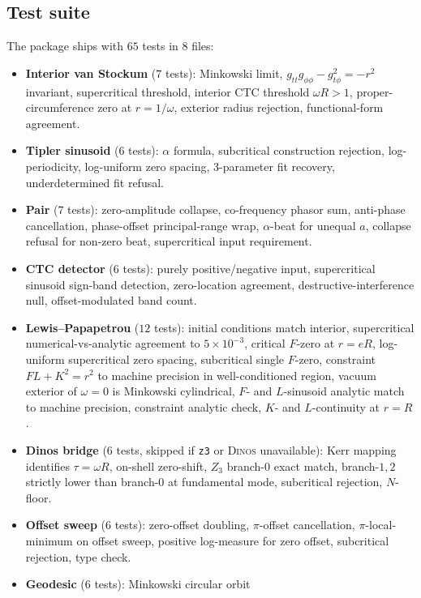\documentclass[11pt,a4paper]{article}
\begin{document}
\subsection{Test suite}

The package ships with $65$ tests in $8$ files:
\begin{itemize}[leftmargin=*]
\item \textbf{Interior van Stockum} ($7$ tests): Minkowski limit,
$g_{tt} g_{\phi\phi} - g_{t\phi}^2 = -r^2$ invariant, supercritical
threshold, interior CTC threshold $\omega R > 1$, proper-circumference
zero at $r = 1/\omega$, exterior radius rejection, functional-form
agreement.
\item \textbf{Tipler sinusoid} ($6$ tests): $\alpha$ formula, subcritical
construction rejection, log-periodicity, log-uniform zero spacing,
$3$-parameter fit recovery, underdetermined fit refusal.
\item \textbf{Pair} ($7$ tests): zero-amplitude collapse, co-frequency
phasor sum, anti-phase cancellation, phase-offset principal-range
wrap, $\alpha$-beat for unequal $a$, collapse refusal for non-zero
beat, supercritical input requirement.
\item \textbf{CTC detector} ($6$ tests): purely positive/negative input,
supercritical sinusoid sign-band detection, zero-location agreement,
destructive-interference null, offset-modulated band count.
\item \textbf{Lewis--Papapetrou} ($12$ tests): initial conditions match
interior, supercritical numerical-vs-analytic agreement to $5\times 10^{-3}$,
critical $F$-zero at $r = e R$, log-uniform supercritical zero spacing,
subcritical single $F$-zero, constraint $F L + K^2 = r^2$ to machine
precision in well-conditioned region, vacuum exterior of $\omega = 0$
is Minkowski cylindrical, $F$- and $L$-sinusoid analytic match to
machine precision, constraint analytic check, $K$- and $L$-continuity
at $r = R$.
\item \textbf{Dinos bridge} ($6$ tests, skipped if \texttt{z3} or
\textsc{Dinos} unavailable): Kerr mapping identifies $\tau = \omega R$,
on-shell zero-shift, $Z_3$ branch-$0$ exact match, branch-$1,2$
strictly lower than branch-$0$ at fundamental mode, subcritical
rejection, $N$-floor.
\item \textbf{Offset sweep} ($6$ tests): zero-offset doubling,
$\pi$-offset cancellation, $\pi$-local-minimum on offset sweep,
positive log-measure for zero offset, subcritical rejection, type
check.
\item \textbf{Geodesic} ($6$ tests): Minkowski circular orbit

\end{itemize}
\end{document}

